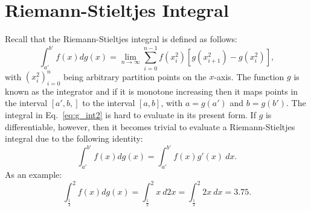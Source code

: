 \documentclass{article}
\theoremstyle{theorem}
\theoremstyle{definition}
\begin{document}

\section{Riemann-Stieltjes Integral}
Recall that the Riemann-Stieltjes integral is defined as follows:
\begin{equation}
\label{eq:g_int2}
\int_{a'}^{b'} f(x) dg(x) =  \lim_{n \rightarrow \infty}\sum_{i=0}^{n-1} f(x_i^2)[g(x_{i+1}^2)-g(x_{i}^2)], 
\end{equation}
\noindent
with $(x_i^2)_{i=0}^n$ being arbitrary partition points on the $x$-axis. 
The function $g$ is known as the integrator and if it is monotone increasing then it maps points in the interval $[a',b,]$ to the interval $[a,b]$, with $a = g(a')$ and $b = g(b')$.
The integral in Eq.~\eqref{eq:g_int2} is hard to evaluate in its present form. If $g$ is differentiable, however, then it becomes trivial to 
evaluate a Riemann-Stieltjes integral due to the following identity:
\begin{equation}
\int_{a'}^{b'} f(x) dg(x) = \int_{a'}^{b'} f(x)g'(x)~dx.
\end{equation}
As an example:
\begin{equation}
\int_{\frac{1}{2}}^{2} f(x) dg(x)=\int_{\frac{1}{2}}^2 x~d2x = \int_{\frac{1}{2}}^2 2x~dx = 3.75. 
\end{equation}
\end{document}
